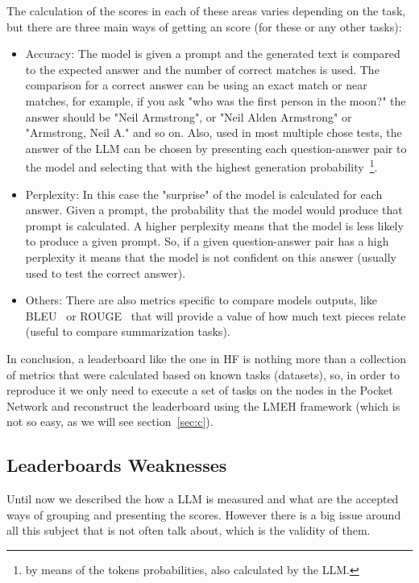 The calculation of the scores in each of these areas varies depending on the task, but there are three main ways of getting an score (for these or any other tasks):
\begin{itemize}
    \item Accuracy: The model is given a prompt and the generated text is compared to the expected answer and the number of correct matches is used. The comparison for a correct answer can be using an exact match or near matches, for example, if you ask "who was the first person in the moon?" the answer should be "Neil Armstrong", or "Neil Alden Armstrong" or "Armstrong, Neil A." and so on. Also, used in most multiple chose tests, the answer of the \gls{LLM} can be chosen by presenting each question-answer pair to the model and selecting that with the highest generation probability~\footnote{by means of the tokens probabilities, also calculated by the \gls{LLM}.}.
    \item Perplexity: In this case the "surprise"  of the model is calculated for each answer. Given a prompt, the probability that the model would produce that prompt is calculated. A higher perplexity means that the model is less likely to produce a given prompt. So, if a given question-answer pair has a high perplexity it means that the model is not confident on this answer (usually used to  test the correct answer).
    \item Others: There are also metrics specific to compare models outputs, like BLEU~\cite{papineni2002bleu} or ROUGE~\cite{lin2004rouge} that will provide a value of how much text pieces relate (useful to compare summarization tasks).
\end{itemize}

In conclusion, a leaderboard like the one in \gls{HF} is nothing more than a collection of metrics that were calculated based on known tasks (datasets), so, in order to reproduce it we only need to execute a set of tasks on the nodes in the Pocket Network and reconstruct the leaderboard using the \gls{LMEH} framework (which is not so easy, as we will see section~\ref{sec:c}). 


\subsection{Leaderboards Weaknesses}

Until now we described the how a \gls{LLM} is measured and what are the accepted ways of grouping and presenting the scores. However there is a big issue around all this subject that is not often talk about, which is the validity of them.

